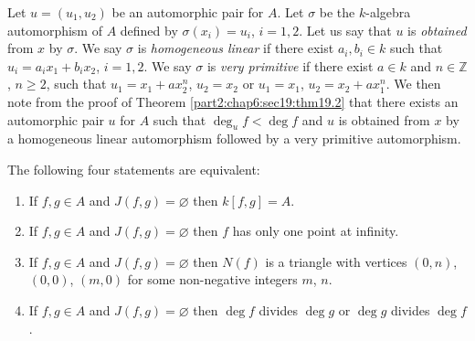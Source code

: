 \begin{remark}\label{part2:chap6:sec19:rem19.2}    
  Let $u= (u_1 , u_2)$ be an automorphic pair for $A$. Let $\sigma$ be
  the $k$-algebra automorphism of $A$ defined by $\sigma (x_i) = u_i$,
  $i=1, 2$. Let us say that $u$ is {\em obtained} from $x$ by
  $\sigma$. We say $\sigma$ is {\em homogeneous linear} if there exist
  $a_i, b_i \in k$ such that $u_i = a_i x_1 + b_i x_2$, $i=1,2$. We
  say $\sigma$ is {\em very primitive} if there exist $a \in k$ and $n
  \in \mathbb{Z}$, $n \geq 2$, such that $u_1 = x_1+ ax_2^n$, $u_2=
  x_2$ or $u_1 = x_1$, $u_2= x_2 + ax_1^n$. We then note from the
  proof of Theorem \ref{part2:chap6:sec19:thm19.2} that there exists
  an automorphic pair $u$ for $A$ such that $\deg_u f< \deg f$ and $u$
  is obtained from $x$ by a homogeneous linear automorphism followed
  by a very primitive automorphism.   
\end{remark}

\begin{thm}\label{part2:chap6:sec19:thm19.4}   
  The following four statements are equivalent:
  \begin{enumerate}[\rm (i)]
  \item If $f, g \in A$ and $J(f, g)= \diameter$ then $k[f, g]=A$.
    \item If $f, g \in A$ and $J (f, g)= \diameter$ then $f$ has only
      one point at infinity.
      \item If $f, g \in A$ and $J(f, g)= \diameter$ then $N(f)$ is a
        triangle with vertices $(0, n)$, $(0, 0)$, $(m, 0)$ for some
        non-negative integers $m$, $n$.
        \item If $f, g \in A$ and $J(f, g)= \diameter$ then $\deg f$
          divides $\deg g$ or $\deg g$ divides $\deg f$.
  \end{enumerate}
\end{thm}

